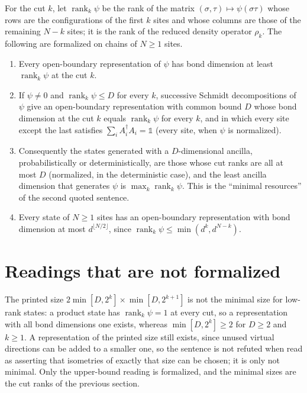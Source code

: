 \documentclass{article}
\begin{document}
For the cut $k$, let $\operatorname{rank}_k\psi$ be the rank of the matrix
$(\sigma,\tau)\mapsto\psi(\sigma\tau)$ whose rows are the configurations of
the first $k$ sites and whose columns are those of the remaining $N-k$ sites;
it is the rank of the reduced density operator $\rho_k$. The following are
formalized on chains of $N\ge 1$ sites.
\begin{enumerate}
    \item Every open-boundary representation of $\psi$ has bond dimension at
          least $\operatorname{rank}_k\psi$ at the cut $k$.
    \item If $\psi\ne0$ and $\operatorname{rank}_k\psi\le D$ for every $k$,
          successive Schmidt decompositions of $\psi$ give an open-boundary
          representation with common bound $D$ whose bond dimension at the cut
          $k$ equals $\operatorname{rank}_k\psi$ for every $k$, and in which every
          site except the last satisfies $\sum_iA_i^\dagger A_i=\mathbb 1$ (every
          site, when $\psi$ is normalized).
    \item Consequently the states generated with a $D$-dimensional ancilla,
          probabilistically or deterministically, are those whose cut ranks are
          all at most $D$ (normalized, in the deterministic case), and the least
          ancilla dimension that generates $\psi$ is $\max_k
              \operatorname{rank}_k\psi$. This is the ``minimal resources'' of the
          second quoted sentence.
    \item Every state of $N\ge 1$ sites has an open-boundary representation with
          bond dimension at most $d^{\lfloor N/2\rfloor}$, since
          $\operatorname{rank}_k\psi\le\min(d^k,d^{N-k})$.
\end{enumerate}

\section{Readings that are not formalized}

The printed size $2\min[D,2^k]\times\min[D,2^{k+1}]$ is not the minimal size
for low-rank states: a product state has $\operatorname{rank}_k\psi=1$ at every
cut, so a representation with all bond dimensions one exists, whereas
$\min[D,2^k]\ge2$ for $D\ge2$ and $k\ge1$. A representation of the printed
size still exists, since unused virtual directions can be added to a smaller
one, so the sentence is not refuted when read as asserting that isometries of
exactly that size can be chosen; it is only not minimal. Only the upper-bound
reading is formalized, and the minimal sizes are the cut ranks of the previous
section.
\end{document}
